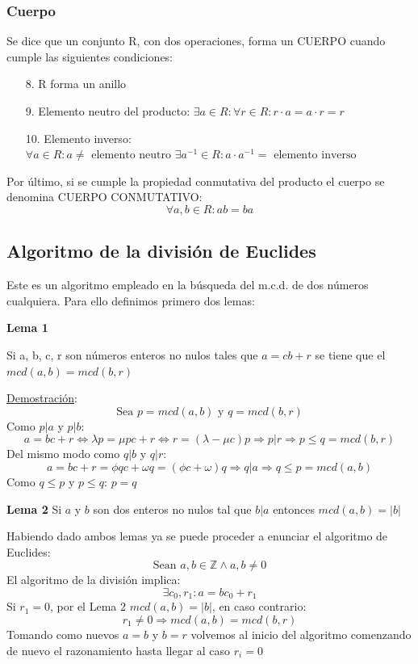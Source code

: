 \documentclass[10pt,a4paper,openright]{book}
\theoremstyle{break}
\begin{document}
\subsubsection*{Cuerpo}
Se dice que un conjunto R, con dos operaciones, forma un CUERPO cuando cumple las siguientes condiciones:
\begin{enumerate}
\item [8.]R forma un anillo
\item [9.]Elemento neutro del producto: $\exists a\in R : \forall r\in R :r\cdot a=a\cdot r=r$
\item [10.]Elemento inverso: $\forall a \in R : a\neq \mbox{ elemento neutro }\exists a^{-1}\in R : a\cdot a^{-1}=\mbox{ elemento inverso}$
\end{enumerate}
Por último, si se cumple la propiedad conmutativa del producto el cuerpo se denomina CUERPO CONMUTATIVO:
$$\forall a,b \in R : ab=ba$$

\subsection{Algoritmo de la división de Euclides}
Este es un algoritmo empleado en la búsqueda del m.c.d. de dos números cualquiera. Para ello definimos primero dos lemas:\par
\textbf{Lema 1}\par
Si a, b, c, r son números enteros no nulos tales que $a=cb+r$ se tiene que el $mcd(a,b)=mcd(b,r)$\par
\underline{Demostración}:
$$\mbox{Sea }p=mcd(a,b)\mbox{ y }q=mcd(b,r)$$
Como $p|a$ y $p|b$:
$$a=bc+r\Leftrightarrow \lambda p= \mu pc +r \Leftrightarrow r=(\lambda-\mu c)p\Rightarrow p|r \Rightarrow p\leq q=mcd(b,r)$$
Del mismo modo como $q|b$ y $q|r$:
$$a=bc+r=\phi qc + \omega q= (\phi c + \omega)q \Rightarrow q|a \Rightarrow q\leq p=mcd(a,b)$$
Como $q\leq p$ y $p\leq q$: $p=q$\par
\vspace{0.5cm}
\textbf{Lema 2}
Si $a$ y $b$ son dos enteros no nulos tal que $b|a$ entonces $mcd(a,b)=|b|$\par
\vspace{0.5cm}
Habiendo dado ambos lemas ya se puede proceder a enunciar el algoritmo de Euclides:
$$\mbox{Sean }a,b\in \mathbb Z \wedge a,b\neq 0$$
El algoritmo de la división implica:
$$\exists c_0, r_1 : a=bc_0+r_1$$
Si $r_1=0$, por el Lema 2 $mcd(a,b)=|b|$, en caso contrario:
$$r_1\neq 0\Rightarrow mcd(a,b)=mcd(b,r)$$
Tomando como nuevos $a=b$ y $b=r$ volvemos al inicio del algoritmo comenzando de nuevo el razonamiento hasta llegar al caso $r_i=0$
\end{document}
